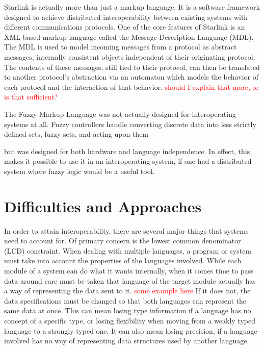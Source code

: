 \documentclass{sig-alternate}
\newcommand{\mycomment}[1]{\textcolor{red}{#1}}
\begin{document}
Starlink \cite{Bromberg:2011} is actually more than just a markup language. It is a software framework designed to achieve distributed interoperability between existing systems with different communications protocols. One of the core features of Starlink is an XML-based markup language called the Message Description Language (MDL). The MDL is used to model incoming messages from a protocol as abstract messages, internally consistent objects independent of their originating protocol. The contents of these messages, still tied to their protocol, can then be translated to another protocol's abstraction via an automaton which models the behavior of each protocol and the interaction of that behavior. \mycomment{should I explain that more, or is that sufficient?}


The Fuzzy Markup Language\cite{Acampora:2013} was not actually designed for interoperating systems at all. Fuzzy controllers handle converting discrete data into less strictly defined sets, fuzzy sets, and acting upon them 

 but was designed for both hardware and language independence. In effect, this makes it possible to use it in an interoperating system, if one had a distributed system where fuzzy logic would be a useful tool.

\section{Difficulties and Approaches}\label{approaches}
In order to attain interoperability, there are several major things that systems need to account for. Of primary concern is the lowest common denominator (LCD) constraint.
When dealing with multiple languages, a program or system must take into account the properties of the languages involved. While each module of a system can do what it wants internally, when it comes time to pass data around care must be taken that language of the target module actually has a way of representing the data sent to it. \mycomment{some example here}
If it does not, the data specifications must be changed so that both languages can represent the same data at once. This can mean losing type information if a language has no concept of a specific type, or losing flexibility when moving from a weakly typed language to a strongly typed one. It can also mean losing precision, if a language involved has no way of representing data structures used by another language.
\end{document}
